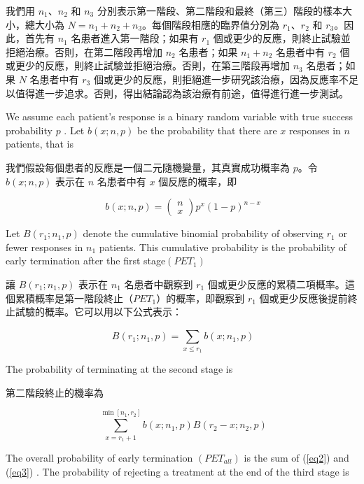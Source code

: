 我們用 $n_1$、$n_2$ 和 $n_3$ 分別表示第一階段、第二階段和最終（第三）階段的樣本大小，總大小為 $N = n_1 + n_2 + n_3$。每個階段相應的臨界值分別為 $r_1$、$r_2$ 和 $r_3$。因此，首先有 $n_1$ 名患者進入第一階段；如果有 $r_1$ 個或更少的反應，則終止試驗並拒絕治療。否則，在第二階段再增加 $n_2$ 名患者；如果 $n_1 + n_2$ 名患者中有 $r_2$ 個或更少的反應，則終止試驗並拒絕治療。否則，在第三階段再增加 $n_3$ 名患者；如果 $N$ 名患者中有 $r_3$ 個或更少的反應，則拒絕進一步研究該治療，因為反應率不足以值得進一步追求。否則，得出結論認為該治療有前途，值得進行進一步測試。

We assume each patient’s response is a binary random variable with true success probability $p$ . Let $b(x; n, p)$ be the probability that there are $x$ responses in $n$ patients, that is

我們假設每個患者的反應是一個二元隨機變量，其真實成功概率為 $p$。令 $b(x; n, p)$ 表示在 $n$ 名患者中有 $x$ 個反應的概率，即

\begin{equation}
\ b(x;n,p)=\left(\begin{array}{c}n\\ x\end{array}\right)p^x(1-p)^{n-x} \label{eq1}
\end{equation}

Let $B(r_1; n_1, p)$ denote the cumulative binomial probability of observing $r_1$ or fewer responses in $n_1$ patients. This cumulative probability is the probability of early termination after the first stage$(PET_1)$

讓 $B(r_1; n_1, p)$ 表示在 $n_1$ 名患者中觀察到 $r_1$ 個或更少反應的累積二項概率。這個累積概率是第一階段終止（$PET_1$）的概率，即觀察到 $r_1$ 個或更少反應後提前終止試驗的概率。它可以用以下公式表示：

\begin{equation}
\ B(r_1;n_1,p)= \sum_{x \leq r_1}^{} b(x;n_1,p) \label{eq2}
\end{equation}

The probability of terminating at the second stage is

第二階段終止的機率為

\begin{equation}
\ \sum_{x=r_1+1}^{\min[n_1,r_2]} b(x;n_1,p)B(r_2-x;n_2,p) \label{eq3}
\end{equation}

The overall probability of early termination $(PET_{all})$ is the sum of (\ref{eq2}) and (\ref{eq3}) . The probability of
rejecting a treatment at the end of the third stage is

